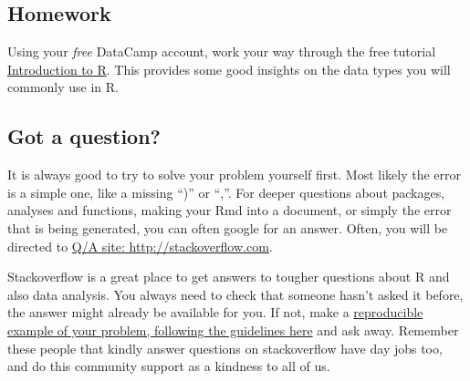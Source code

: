 \documentclass[]{article}
\begin{document}
\hypertarget{homework}{%
\subsection{Homework}\label{homework}}

Using your \emph{free} DataCamp account, work your way through the free
tutorial
\href{https://www.datacamp.com/courses/free-introduction-to-r}{Introduction
to R}. This provides some good insights on the data types you will
commonly use in R.

\hypertarget{got-a-question}{%
\subsection{Got a question?}\label{got-a-question}}

It is always good to try to solve your problem yourself first. Most
likely the error is a simple one, like a missing ``)'' or ``,''. For
deeper questions about packages, analyses and functions, making your Rmd
into a document, or simply the error that is being generated, you can
often google for an answer. Often, you will be directed to
\href{http://stackoverflow.com}{Q/A site: http://stackoverflow.com}.

Stackoverflow is a great place to get answers to tougher questions about
R and also data analysis. You always need to check that someone hasn't
asked it before, the answer might already be available for you. If not,
make a
\href{https://reprex.tidyverse.org/articles/reprex-dos-and-donts.html}{reproducible
example of your problem, following the guidelines here} and ask away.
Remember these people that kindly answer questions on stackoverflow have
day jobs too, and do this community support as a kindness to all of us.
\end{document}

